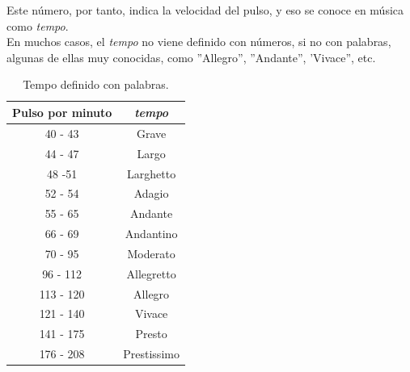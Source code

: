 \documentclass[a4paper, openright, 11pt, titlepage]{report}
\theoremstyle{definition}\newtheorem{defin}[propo]{Definition}
\theoremstyle{definition}\newtheorem{obser}[propo]{Remark}
\theoremstyle{definition}\newtheorem{ejem}[propo]{Ejemplo}
\theoremstyle{definition}\newtheorem{algoritmo}[propo]{Algoritmo}
\begin{document}
Este número, por tanto, indica la velocidad del pulso, y eso se conoce en música como \textit{tempo}.\\ En muchos casos, el \textit{tempo} no viene definido con números, si no con palabras, algunas de ellas muy conocidas, como ''Allegro'', ''Andante'', 'Vivace'', etc.
\begin{table}[H]
    \centering
    \begin{tabular}{c|c}
     Pulso por minuto & \textit{tempo} \\
    \hline \hline
     40 - 43 & Grave\\
     44 - 47 & Largo \\
     48 -51 & Larghetto \\
     52 - 54 & Adagio\\
     55 - 65 & Andante \\
     66 - 69 & Andantino \\
     70 - 95 & Moderato \\
     96 - 112 & Allegretto \\
     113 - 120 & Allegro \\
     121 - 140 & Vivace \\
     141 - 175 & Presto\\
     176 - 208 & Prestissimo\\
     \hline
    \end{tabular}
    \caption{Tempo definido con palabras.}
\end{table}
\end{document}
